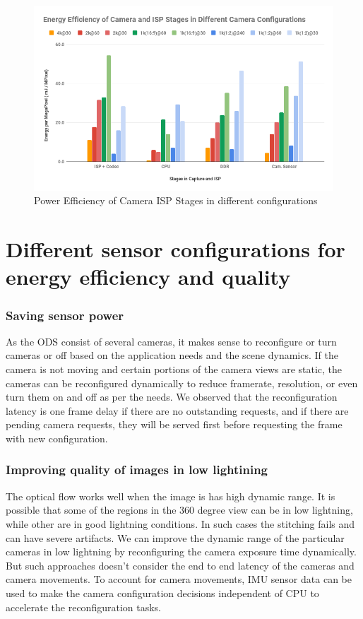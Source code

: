 \begin{figure}
	\begin{center}
		\includegraphics[width=1\textwidth]{data/images/Power_Efficiency_of_Camera_ISP_Stages_in_different_configurations.png}
		\caption{Power Efficiency of Camera ISP Stages in different configurations}
		\label{fig:ex_4_9}
	\end{center}
	\vspace{-0.3in}
\end{figure} 



\section{Different sensor configurations for energy efficiency and quality}
\subsubsection{Saving sensor power}
As the ODS consist of several cameras, it makes sense to reconfigure or turn cameras or off based on the application needs and the scene dynamics. If the camera is not moving and certain portions of the camera views are static, the cameras can be reconfigured dynamically to reduce framerate, resolution, or even turn them on and off as per the needs. We observed that the reconfiguration latency is one frame delay if there are no outstanding requests, and if there are pending camera requests, they will be served first before requesting the frame with new configuration. 
\subsubsection{Improving quality of images in low lightining}
The optical flow works well when the image is has high dynamic range. It is possible that some of the regions in the 360 degree view can be in low lightning, while other are in good lightning conditions. In such cases the stitching fails and can have severe artifacts. We can improve the dynamic range of the particular cameras in low lightning by reconfiguring the camera exposure time dynamically. But such approaches doesn't consider the end to end latency of the cameras and camera movements. To account for camera movements, IMU sensor data can be used to make the camera configuration decisions independent of CPU to accelerate the reconfiguration tasks. 

